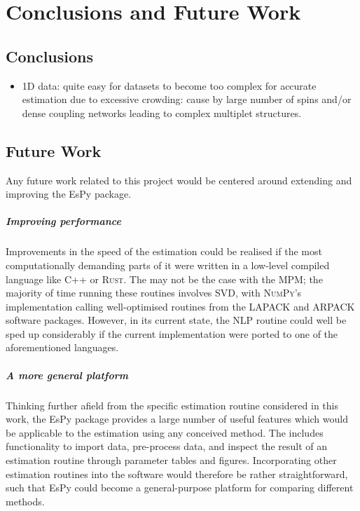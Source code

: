 \chapter{Conclusions and Future Work}
\label{chap:conclusions}

\section{Conclusions}
\begin{itemize}
    \item 1D data: quite easy for datasets to become too complex for accurate
        estimation due to excessive crowding: cause by large number of spins
        and/or dense coupling networks leading to complex multiplet
        structures.
\end{itemize}

\section{Future Work}
\label{sec:future-work}
Any future work related to this project would be centered around extending and
improving the \ac{EsPy} package.

\paragraph{Improving performance}
Improvements in the speed of the estimation
could be realised if the most computationally demanding parts of it were
written in a low-level compiled language like C++ or \textsc{Rust}. The may not
be the case with the \ac{MPM}; the majority of time running these routines
involves \ac{SVD}, with \textsc{NumPy}'s implementation calling well-optimised
routines from the \textsc{LAPACK} and \textsc{ARPACK} software packages.
However, in its current state, the \ac{NLP} routine could well be sped up
considerably if the current \Python implementation were ported to one of the
aforementioned languages.

\paragraph{A more general platform}
Thinking further afield from the specific estimation routine considered in this
work, the \ac{EsPy} package provides a large number of useful features which
would be applicable to the estimation using any conceived method. The includes
functionality to import data, pre-process data, and inspect the result of an
estimation routine through parameter tables and figures.
Incorporating other estimation routines into the software would therefore be
rather straightforward, such that \ac{EsPy} could become a general-purpose
platform for comparing different methods.

